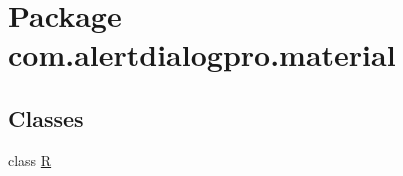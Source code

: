 \hypertarget{namespacecom_1_1alertdialogpro_1_1material}{}\section{Package com.\+alertdialogpro.\+material}
\label{namespacecom_1_1alertdialogpro_1_1material}
\subsection*{Classes}
\begin{DoxyCompactItemize}
\item 
class \hyperlink{classcom_1_1alertdialogpro_1_1material_1_1_r}{R}
\end{DoxyCompactItemize}
